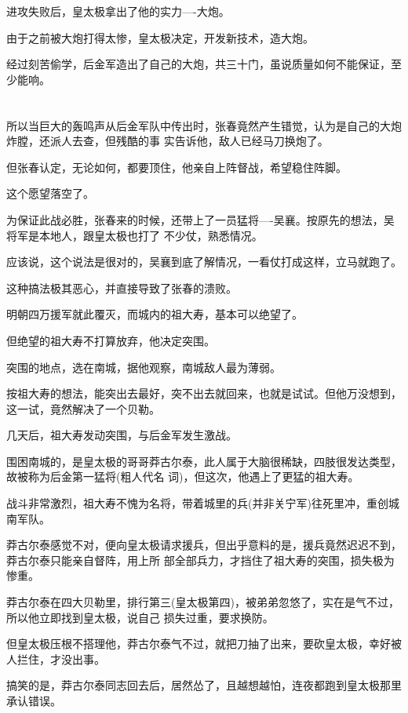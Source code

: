 \documentclass[11pt,a4paper,onecolumn]{article}
\begin{document}
进攻失败后，皇太极拿出了他的实力----大炮。

由于之前被大炮打得太惨，皇太极决定，开发新技术，造大炮。

经过刻苦偷学，后金军造出了自己的大炮，共三十门，虽说质量如何不能保证，至少能响。

\section[\thesection]{}

所以当巨大的轰鸣声从后金军队中传出时，张春竟然产生错觉，认为是自己的大炮炸膛，还派人去查，但残酷的事
实告诉他，敌人已经马刀换炮了。

但张春认定，无论如何，都要顶住，他亲自上阵督战，希望稳住阵脚。

这个愿望落空了。

为保证此战必胜，张春来的时候，还带上了一员猛将----吴襄。按原先的想法，吴将军是本地人，跟皇太极也打了
不少仗，熟悉情况。

应该说，这个说法是很对的，吴襄到底了解情况，一看仗打成这样，立马就跑了。

这种搞法极其恶心，并直接导致了张春的溃败。

明朝四万援军就此覆灭，而城内的祖大寿，基本可以绝望了。

但绝望的祖大寿不打算放弃，他决定突围。

突围的地点，选在南城，据他观察，南城敌人最为薄弱。

按祖大寿的想法，能突出去最好，突不出去就回来，也就是试试。但他万没想到，这一试，竟然解决了一个贝勒。

几天后，祖大寿发动突围，与后金军发生激战。

围困南城的，是皇太极的哥哥莽古尔泰，此人属于大脑很稀缺，四肢很发达类型，故被称为后金第一猛将(粗人代名
词)，但这次，他遇上了更猛的祖大寿。

战斗非常激烈，祖大寿不愧为名将，带着城里的兵(并非关宁军)往死里冲，重创城南军队。

莽古尔泰感觉不对，便向皇太极请求援兵，但出乎意料的是，援兵竟然迟迟不到，莽古尔泰只能亲自督阵，用上所
部全部兵力，才挡住了祖大寿的突围，损失极为惨重。

莽古尔泰在四大贝勒里，排行第三(皇太极第四)，被弟弟忽悠了，实在是气不过，所以他立即找到皇太极，说自己
损失过重，要求换防。

但皇太极压根不搭理他，莽古尔泰气不过，就把刀抽了出来，要砍皇太极，幸好被人拦住，才没出事。

搞笑的是，莽古尔泰同志回去后，居然怂了，且越想越怕，连夜都跑到皇太极那里承认错误。
\end{document}
